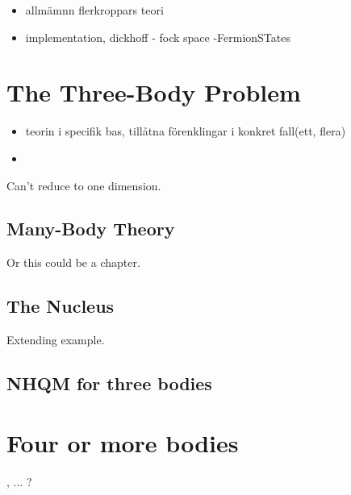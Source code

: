\documentclass[12pt,a4paper]{report}
\begin{document}
\begin{itemize}
  \item allmämnn flerkroppars teori
  \item implementation, dickhoff - fock space -FermionSTates
\end{itemize} 


\chapter{The Three-Body Problem} %
\label{cha:the_three_body_problem}

\begin{itemize}
  \item teorin i specifik bas, tillåtna förenklingar i konkret fall(ett, flera)
  \item 
\end{itemize}

Can't reduce to one dimension.

\section{Many-Body Theory} %
\label{sec:many_body_theory}

Or this could be a chapter.



\section{The  Nucleus} %
\label{sec:the_^6he_nucleus}

Extending  example.


\section{NHQM for three bodies}



\chapter{Four or more bodies} %
\label{cha:four_or_more_bodies}

,  ... ?

\end{document}
